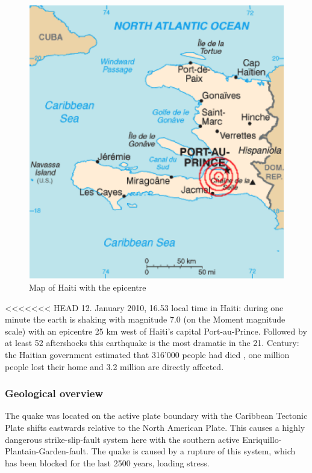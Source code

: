 \documentclass[11pt]{article}
\begin{document}
\begin{figure}
\includegraphics[scale=0.8]{Bilder/KarteHaiti.png}
\caption{Map of Haiti with the epicentre}%
\label{pic:map_haiti}
\end{figure}




<<<<<<< HEAD
12. January 2010, 16.53 local time in Haiti: during one minute the earth is shaking with magnitude 7.0 \cite{nyt:mag} (on the Moment magnitude scale) with an epicentre 25 km west of Haiti’s capital Port-au-Prince. Followed by at least 52 aftershocks  this earthquake is the most dramatic in the 21. Century: the Haitian government estimated that 316’000 people had died \cite{web:cbc1} , one million people lost their home  and 3.2 million are directly affected. \cite{web:ear}

\subsubsection*{Geological overview}

The quake was located on the active plate boundary with the Caribbean Tectonic Plate shifts eastwards relative to the North American Plate. This causes a highly dangerous strike-slip-fault system here with the southern active Enriquillo-Plantain-Garden-fault. The quake is caused by a rupture of this system, which has been blocked for the last 2500 years, loading stress. \cite{web:bbc1}
\end{document}
